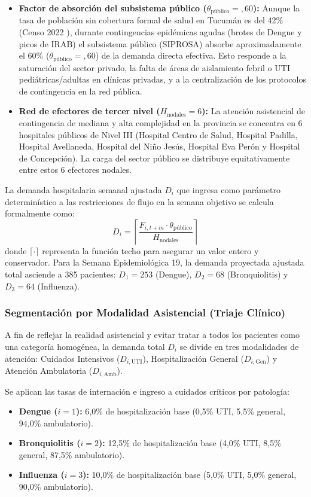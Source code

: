 \documentclass[conference]{IEEEtran}
\begin{document}
\begin{itemize}
    \item \textbf{Factor de absorción del subsistema público ($\theta_{\text{público}} = {,}60$):} Aunque la tasa de población sin cobertura formal de salud en Tucumán es del 42\% (Censo 2022 \cite{ref12}), durante contingencias epidémicas agudas (brotes de Dengue y picos de IRAB) el subsistema público (SIPROSA) absorbe aproximadamente el 60\% ($\theta_{\text{público}} = {,}60$) de la demanda directa efectiva. Esto responde a la saturación del sector privado, la falta de áreas de aislamiento febril o UTI pediátricas/adultas en clínicas privadas, y a la centralización de los protocolos de contingencia en la red pública.
    \item \textbf{Red de efectores de tercer nivel ($H_{\text{nodales}} = 6$):} La atención asistencial de contingencia de mediana y alta complejidad en la provincia se concentra en 6 hospitales públicos de Nivel III (Hospital Centro de Salud, Hospital Padilla, Hospital Avellaneda, Hospital del Niño Jesús, Hospital Eva Perón y Hospital de Concepción). La carga del sector público se distribuye equitativamente entre estos 6 efectores nodales.
\end{itemize}

La demanda hospitalaria semanal ajustada $D_i$ que ingresa como parámetro determinístico a las restricciones de flujo en la semana objetivo se calcula formalmente como:
\begin{equation}
    D_i = \left\lceil \frac{F_{i, t+m} \cdot \theta_{\text{público}}}{H_{\text{nodales}}} \right\rceil
\end{equation}
donde $\lceil \cdot \rceil$ representa la función techo para asegurar un valor entero y conservador. Para la Semana Epidemiológica 19, la demanda proyectada ajustada total asciende a 385 pacientes: $D_1 = 253$ (Dengue), $D_2 = 68$ (Bronquiolitis) y $D_3 = 64$ (Influenza).

\subsubsection{Segmentación por Modalidad Asistencial (Triaje Clínico)}
A fin de reflejar la realidad asistencial y evitar tratar a todos los pacientes como una categoría homogénea, la demanda total $D_i$ se divide en tres modalidades de atención: Cuidados Intensivos ($D_{i,\text{UTI}}$), Hospitalización General ($D_{i,\text{Gen}}$) y Atención Ambulatoria ($D_{i,\text{Amb}}$).

Se aplican las tasas de internación e ingreso a cuidados críticos por patología:
\begin{itemize}
    \item \textbf{Dengue ($i=1$):} 6{,}0\% de hospitalización base (0{,}5\% UTI, 5{,}5\% general, 94{,}0\% ambulatorio).
    \item \textbf{Bronquiolitis ($i=2$):} 12{,}5\% de hospitalización base (4{,}0\% UTI, 8{,}5\% general, 87{,}5\% ambulatorio).
    \item \textbf{Influenza ($i=3$):} 10{,}0\% de hospitalización base (5{,}0\% UTI, 5{,}0\% general, 90{,}0\% ambulatorio).
\end{itemize}
\end{document}
